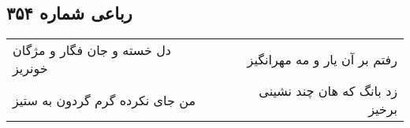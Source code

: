 \begin{center}
\section*{رباعی شماره ۳۵۴}
\label{sec:sh354}
\begin{longtable}{l p{0.5cm} r}
دل خسته و جان فگار و مژگان خونریز
&&
رفتم بر آن یار و مه مهرانگیز
\\
من جای نکرده گرم گردون به ستیز
&&
زد بانگ که هان چند نشینی برخیز
\\
\end{longtable}
\end{center}
